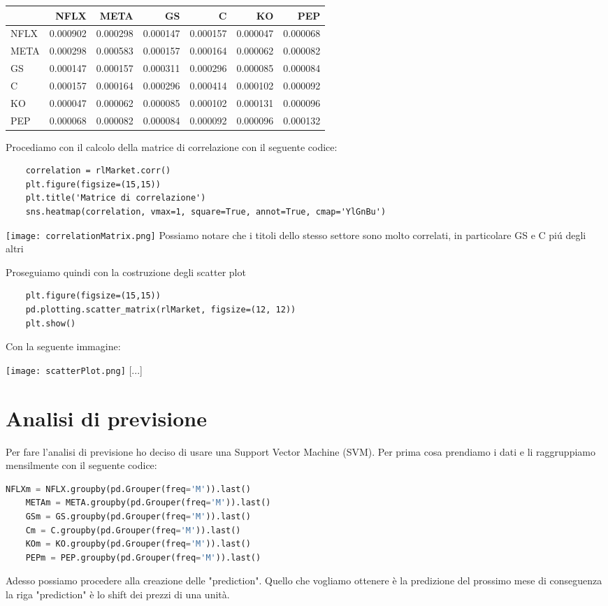 \documentclass{report}
\begin{document}
\begin{tabular}{lrrrrrr}
\toprule
{} &      NFLX &      META &        GS &         C &        KO &       PEP \\
\midrule
NFLX &  0.000902 &  0.000298 &  0.000147 &  0.000157 &  0.000047 &  0.000068 \\
META &  0.000298 &  0.000583 &  0.000157 &  0.000164 &  0.000062 &  0.000082 \\
GS   &  0.000147 &  0.000157 &  0.000311 &  0.000296 &  0.000085 &  0.000084 \\
C    &  0.000157 &  0.000164 &  0.000296 &  0.000414 &  0.000102 &  0.000092 \\
KO   &  0.000047 &  0.000062 &  0.000085 &  0.000102 &  0.000131 &  0.000096 \\
PEP  &  0.000068 &  0.000082 &  0.000084 &  0.000092 &  0.000096 &  0.000132 \\
\bottomrule
\end{tabular}

Procediamo con il calcolo della matrice di correlazione con il seguente codice:
\begin{lstlisting}
    correlation = rlMarket.corr()
    plt.figure(figsize=(15,15))
    plt.title('Matrice di correlazione')
    sns.heatmap(correlation, vmax=1, square=True, annot=True, cmap='YlGnBu')
\end{lstlisting}

\texttt{[image: correlationMatrix.png]}
Possiamo notare che i titoli dello stesso settore sono molto correlati, in particolare GS e C piú degli altri

Proseguiamo quindi con la costruzione degli scatter plot
\begin{lstlisting}
    plt.figure(figsize=(15,15))
    pd.plotting.scatter_matrix(rlMarket, figsize=(12, 12))
    plt.show()
\end{lstlisting}
Con la seguente immagine:

\texttt{[image: scatterPlot.png]}
[...]
\chapter{Analisi di previsione}
Per fare l'analisi di previsione ho deciso di usare una Support Vector Machine (SVM). Per prima cosa prendiamo i dati e li raggruppiamo mensilmente con il seguente codice:
\begin{lstlisting}[language=python]
    NFLXm = NFLX.groupby(pd.Grouper(freq='M')).last()
    METAm = META.groupby(pd.Grouper(freq='M')).last()
    GSm = GS.groupby(pd.Grouper(freq='M')).last()
    Cm = C.groupby(pd.Grouper(freq='M')).last()
    KOm = KO.groupby(pd.Grouper(freq='M')).last()
    PEPm = PEP.groupby(pd.Grouper(freq='M')).last()
\end{lstlisting}
Adesso possiamo procedere alla creazione delle "prediction". Quello che vogliamo ottenere è la predizione del prossimo mese di conseguenza la riga "prediction" è lo shift dei prezzi di una unità.
\end{document}

